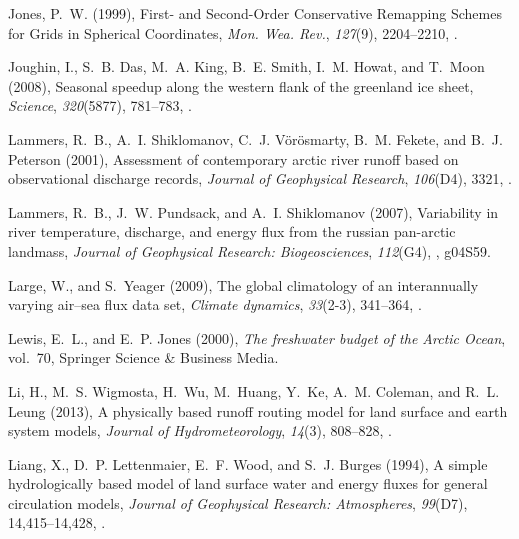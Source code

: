 \documentclass[jgrga, draft]{agutex}
\begin{document}
\begin{article}
\begin{thebibliography}{79}
Jones, P.~W. (1999), {First- and Second-Order Conservative Remapping Schemes
  for Grids in Spherical Coordinates}, \textit{Mon. Wea. Rev.},
  \textit{127}(9), 2204--2210, .

Joughin, I., S.~B. Das, M.~A. King, B.~E. Smith, I.~M. Howat, and T.~Moon
  (2008), Seasonal speedup along the western flank of the greenland ice sheet,
  \textit{Science}, \textit{320}(5877), 781--783,
  .

Lammers, R.~B., A.~I. Shiklomanov, C.~J. Vörösmarty, B.~M. Fekete, and B.~J.
  Peterson (2001), Assessment of contemporary arctic river runoff based on
  observational discharge records, \textit{Journal of Geophysical Research},
  \textit{106}(D4), 3321, .

Lammers, R.~B., J.~W. Pundsack, and A.~I. Shiklomanov (2007), Variability in
  river temperature, discharge, and energy flux from the russian pan-arctic
  landmass, \textit{Journal of Geophysical Research: Biogeosciences},
  \textit{112}(G4), , g04S59.

Large, W., and S.~Yeager (2009), The global climatology of an interannually
  varying air--sea flux data set, \textit{Climate dynamics}, \textit{33}(2-3),
  341--364, .

Lewis, E.~L., and E.~P. Jones (2000), \textit{The freshwater budget of the
  Arctic Ocean}, vol.~70, Springer Science \& Business Media.

Li, H., M.~S. Wigmosta, H.~Wu, M.~Huang, Y.~Ke, A.~M. Coleman, and R.~L. Leung
  (2013), A physically based runoff routing model for land surface and earth
  system models, \textit{Journal of Hydrometeorology}, \textit{14}(3),
  808--828, .

Liang, X., D.~P. Lettenmaier, E.~F. Wood, and S.~J. Burges (1994), A simple
  hydrologically based model of land surface water and energy fluxes for
  general circulation models, \textit{Journal of Geophysical Research:
  Atmospheres}, \textit{99}(D7), 14,415--14,428, .


\end{thebibliography}
\end{article}
\end{document}
